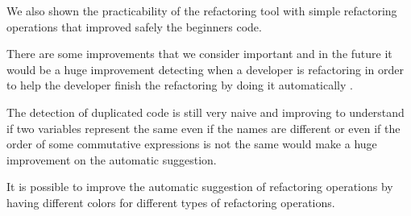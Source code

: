 We also shown the practicability of the refactoring tool with simple refactoring operations
that improved safely the beginners code.

There are some improvements that we consider important and in the future it would  %
be a huge improvement detecting when a developer is refactoring in order to help the developer finish the
refactoring by doing it automatically \cite{ge2012reconciling}.

The detection of duplicated code is still very naive and improving to understand if
two variables represent the same even if the names are different or even if the
 order of some commutative expressions is not the same would make a huge improvement
 on the automatic suggestion.

It is possible to improve the automatic suggestion of refactoring operations by
having different colors for different types of refactoring operations.
